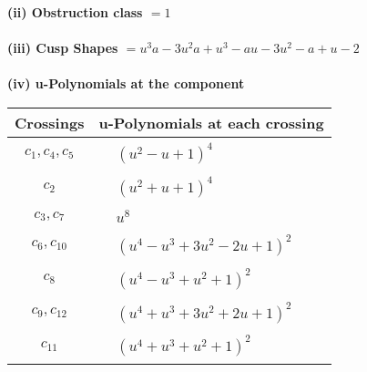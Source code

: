 \documentclass[1p]{elsarticle_modified}
\theoremstyle{definition}
\begin{document}
\flushleft \textbf{(ii) Obstruction class $= 1$}\\~\\
\flushleft \textbf{(iii) Cusp Shapes $= u^3 a-3 u^2 a+u^3- a u-3 u^2- a+u-2$}\\~\\
\newpage\renewcommand{\arraystretch}{1}
\flushleft \textbf{(iv) u-Polynomials at the component}\newline \\
\begin{tabular}{m{50pt}|m{274pt}}
Crossings & \hspace{64pt}u-Polynomials at each crossing \\
\hline $$\begin{aligned}c_{1},c_{4},c_{5}\end{aligned}$$&$\begin{aligned}
&(u^2- u+1)^4
\end{aligned}$\\
\hline $$\begin{aligned}c_{2}\end{aligned}$$&$\begin{aligned}
&(u^2+u+1)^4
\end{aligned}$\\
\hline $$\begin{aligned}c_{3},c_{7}\end{aligned}$$&$\begin{aligned}
&u^8
\end{aligned}$\\
\hline $$\begin{aligned}c_{6},c_{10}\end{aligned}$$&$\begin{aligned}
&(u^4- u^3+3 u^2-2 u+1)^2
\end{aligned}$\\
\hline $$\begin{aligned}c_{8}\end{aligned}$$&$\begin{aligned}
&(u^4- u^3+u^2+1)^2
\end{aligned}$\\
\hline $$\begin{aligned}c_{9},c_{12}\end{aligned}$$&$\begin{aligned}
&(u^4+u^3+3 u^2+2 u+1)^2
\end{aligned}$\\
\hline $$\begin{aligned}c_{11}\end{aligned}$$&$\begin{aligned}
&(u^4+u^3+u^2+1)^2
\end{aligned}$\\
\hline
\end{tabular}\\~\\
\end{document}
